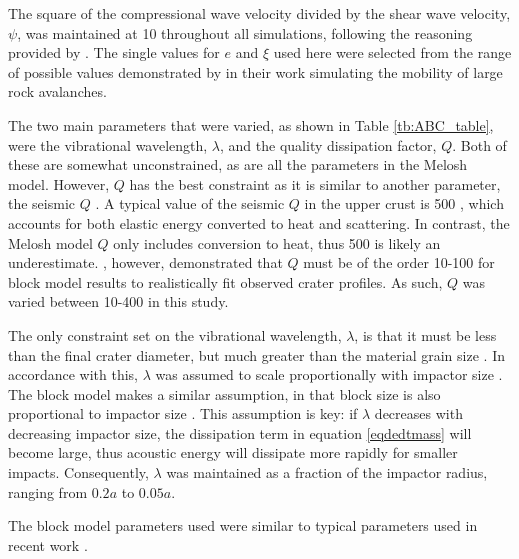 

The square of the compressional wave velocity divided by the shear wave velocity, $\psi$, was maintained at 10 throughout all simulations, following the reasoning provided by \citet{collins2003acoustic}. The single values for $e$ and $\xi$ used here were selected from the range of possible values demonstrated by \citet{collins2003acoustic} in their work simulating the mobility of large rock avalanches. 

The two main parameters that were varied, as shown in Table \ref{tb:ABC_table}, were the vibrational wavelength, $\lambda$, and the quality dissipation factor, $Q$. Both of these are somewhat unconstrained, as are all the parameters in the Melosh model. However, $Q$ has the best constraint as it is similar to another parameter, the seismic $Q$ \citep{melosh1996dynamical}. A typical value of the seismic $Q$ in the upper crust is 500 \citep{anderson1989theory}, which accounts for both elastic energy converted to heat and scattering. In contrast, the Melosh model $Q$ only includes conversion to heat, thus 500 is likely an underestimate. \citet{melosh1999impact}, however, demonstrated that $Q$ must be of the order 10-100 for block model results to realistically fit observed crater profiles. As such, $Q$ was varied between 10-400 in this study. 

The only constraint set on the vibrational wavelength, $\lambda$, is that it must be less than the final crater diameter, but much greater than the material grain size \citep{melosh1979acoustic,collins2002numerical}. In accordance with this, $\lambda$ was assumed to scale proportionally with impactor size \citep{collins2003acoustic}. The block model makes a similar assumption, in that block size is also proportional to impactor size \citep{ivanov1997block}. This assumption is key: if $\lambda$ decreases with decreasing impactor size, the dissipation term in equation \ref{eqdedtmass} will become large, thus acoustic energy will dissipate more rapidly for smaller impacts. Consequently, $\lambda$ was maintained as a fraction of the impactor radius, ranging from $0.2a$ to $0.05a$.

The block model parameters used were similar to typical parameters used in recent work \citetext{e.g., \citet{wunnemann2003numerical}}. 
